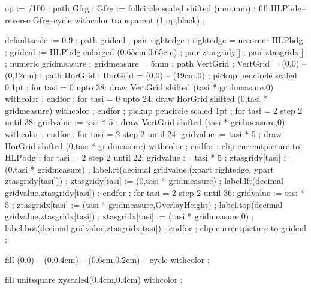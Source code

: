 op := /100 ;
path Gfrg ;
Gfrg := fullcircle scaled  shifted (mm,mm) ;
fill HLPbdg--reverse Gfrg--cycle withcolor transparent (1,op,black) ;
\stopuseMPgraphic

defaultscale := 0.9 ;
path gridenl ;
pair rightedge ; rightedge = urcorner HLPbdg ;
gridenl := HLPbdg enlarged (0.65cm,0.65cm) ;
pair ztasgridy[] ; 
pair ztasgridx[] ;
numeric gridmeasure ; gridmeasure = 5mm ;
path VertGrid ; VertGrid = (0,0) -- (0,12cm) ;
path HorGrid ; HorGrid = (0,0) -- (19cm,0) ;
pickup pencircle scaled 0.1pt ;
for tasi = 0 upto 38:
	draw VertGrid shifted (tasi * gridmeasure,0) withcolor  ;
endfor ;
for tasi = 0 upto 24:
	draw HorGrid shifted (0,tasi * gridmeasure) withcolor  ;
endfor ;
pickup pencircle scaled 1pt ;
for tasi = 2 step 2 until 38:
	gridvalue := tasi * 5 ;
	draw VertGrid shifted (tasi * gridmeasure,0) withcolor  ;
endfor ;
for tasi = 2 step 2 until 24:
	gridvalue := tasi * 5 ;
	draw HorGrid shifted (0,tasi * gridmeasure) withcolor  ;
endfor ;
clip currentpicture to HLPbdg ;
for tasi = 2 step 2 until 22:
 	gridvalue := tasi * 5 ;
 	ztasgridy[tasi] := (0,tasi * gridmeasure) ;
 	label.rt(decimal gridvalue,(xpart rightedge, ypart ztasgridy[tasi])) ;
	ztasgridy[tasi] := (0,tasi * gridmeasure) ;
	label.lft(decimal gridvalue,ztasgridy[tasi]) ;
endfor ;
for tasi = 2 step 2 until 36:
  	gridvalue := tasi * 5 ;
	ztasgridx[tasi] := (tasi * gridmeasure,OverlayHeight) ;
	label.top(decimal gridvalue,ztasgridx[tasi]) ;
  	ztasgridx[tasi] := (tasi * gridmeasure,0) ;
  	label.bot(decimal gridvalue,ztasgridx[tasi]) ;
endfor ;
clip currentpicture to gridenl ;
\stopuseMPgraphic


  fill (0,0) -- (0,0.4cm) -- (0.6cm,0.2cm) -- cycle 
       withcolor  ;
\stopuniqueMPgraphic

  fill unitsquare xyscaled(0.4cm,0.4cm) 
       withcolor  ;
\stopuniqueMPgraphic


\protect

\stopmodule
